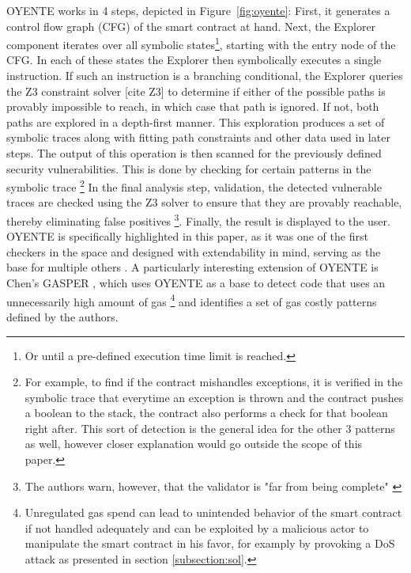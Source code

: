 \documentclass[letterpaper,twocolumn,10pt]{article}
\begin{document}
OYENTE works in 4 steps, depicted in Figure~\ref{fig:oyente}: First, it generates a control flow graph (CFG) of the smart contract at hand. Next, the Explorer component iterates over all symbolic states\footnote{Or until a pre-defined execution time limit is reached.}, starting with the entry node of the CFG. In each of these states the Explorer then symbolically executes a single instruction. If such an instruction is a branching conditional, the Explorer queries the Z3 constraint solver [cite Z3] to determine if either of the possible paths is provably impossible to reach, in which case that path is ignored. If not, both paths are explored in a depth-first manner. This exploration produces a set of symbolic traces along with fitting path constraints and other data used in later steps. The output of this operation is then scanned for the previously defined security vulnerabilities. This is done by checking for certain patterns in the symbolic trace \footnote{For example, to find if the contract mishandles exceptions, it is verified in the symbolic trace that everytime an exception is thrown and the contract pushes a boolean to the stack, the contract also performs a check for that boolean right after. This sort of detection is the general idea for the other 3 patterns as well, however closer explanation would go outside the scope of this paper.} In the final analysis step, validation, the detected vulnerable traces are checked using the Z3 solver to ensure that they are provably reachable, thereby eliminating false positives \footnote{The authors warn, however, that the validator is "far from being complete" \cite{luu_chu_olickel_saxena_hobor_2016}}. Finally, the result is displayed to the user. OYENTE is specifically highlighted in this paper, as it was one of the first checkers in the space and designed with extendability in mind, serving as the base for multiple others \cite{zhou_hua_pi_sun_nomura_yamashita_kurihara_2018}\cite{albert_gordillo_livshits_rubio_sergey_2018}. A particularly interesting extension of OYENTE is Chen's GASPER \cite{chen_li_luo_zhang_2017}, which uses OYENTE as a base to detect code that uses an unnecessarily high amount of gas \footnote{Unregulated gas spend can lead to unintended behavior of the smart contract if not handled adequately and can be exploited by a malicious actor to manipulate the smart contract in his favor, for examply by provoking a DoS attack as presented in section \ref{subsection:sol}.} and identifies a set of gas costly patterns defined by the authors. 
\end{document}

